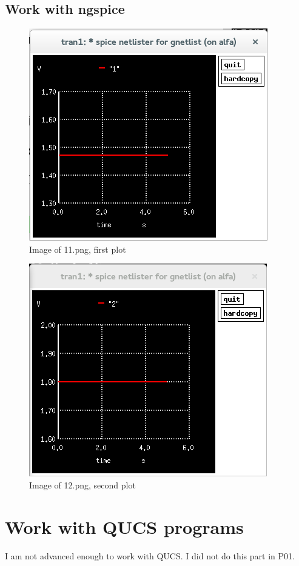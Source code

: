 \documentclass{report}
\begin{document}
\subsection{Work with ngspice}
\begin{figure}[!b]
    \includegraphics[scale=1]{11.png}
    \caption{Image of 11.png, first plot}
\bigbreak
\end{figure}
\hskip 5pt
\begin{figure}[!t]
    \includegraphics[scale=1]{12.png}
    \caption{Image of 12.png, second plot}
\end{figure}

\section{Work with QUCS programs}
I am not advanced enough to work with QUCS. I did not do this part in P01.
\end{document}
